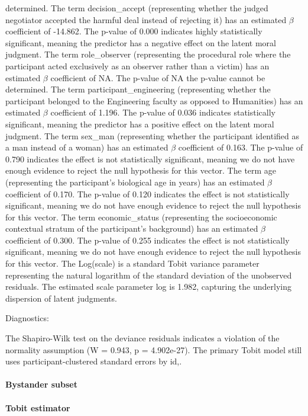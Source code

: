 \documentclass[11pt]{article}
\begin{document}
determined. The term decision\_accept (representing whether the judged negotiator accepted the harmful deal instead of rejecting it) has an estimated $\beta$ coefficient of -14.862. The p-value of 0.000 indicates highly statistically significant, meaning the predictor has a negative effect on the latent moral judgment. The term role\_observer (representing the procedural role where the participant acted exclusively as an observer rather than a victim) has an estimated $\beta$ coefficient of NA. The p-value of NA the p-value cannot be determined. The term participant\_engineering (representing whether the participant belonged to the Engineering faculty as opposed to Humanities) has an estimated $\beta$ coefficient of 1.196. The p-value of 0.036 indicates statistically significant, meaning the predictor has a positive effect on the latent moral judgment. The term sex\_man (representing whether the participant identified as a man instead of a woman) has an estimated $\beta$ coefficient of 0.163. The p-value of 0.790 indicates the effect is not statistically significant, meaning we do not have enough evidence to reject the null hypothesis for this vector. The term age (representing the participant's biological age in years) has an estimated $\beta$ coefficient of 0.170. The p-value of 0.120 indicates the effect is not statistically significant, meaning we do not have enough evidence to reject the null hypothesis for this vector. The term economic\_status (representing the socioeconomic contextual stratum of the participant's background) has an estimated $\beta$ coefficient of 0.300. The p-value of 0.255 indicates the effect is not statistically significant, meaning we do not have enough evidence to reject the null hypothesis for this vector. The Log(scale) is a standard Tobit variance parameter representing the natural logarithm of the standard deviation of the unobserved residuals. The estimated scale parameter log is 1.982, capturing the underlying dispersion of latent judgments.

Diagnostics:

The Shapiro-Wilk test on the deviance residuals indicates a violation of the normality assumption (W = 0.943, p = 4.902e-27). The primary Tobit model still uses participant-clustered standard errors by id,.


\paragraph{Bystander subset}

\paragraph{Tobit estimator}
\end{document}

